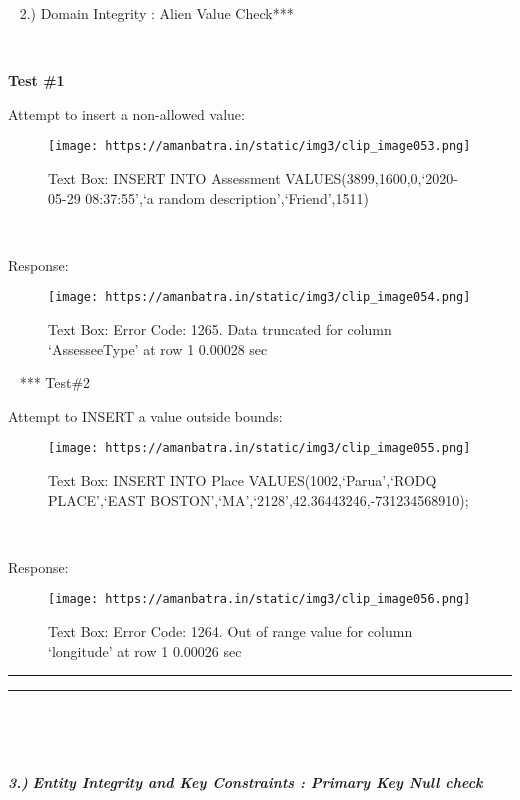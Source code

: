 \documentclass[
]{article}
\begin{document}
~ \textbf{\emph{ }}2.) Domain Integrity : Alien Value Check***

~

\textbf{Test \#1}

Attempt to insert a non-allowed value:

\begin{figure}
\centering
\texttt{[image: https://amanbatra.in/static/img3/clip\_image053.png]}
\caption{Text Box: INSERT INTO Assessment VALUES(3899,1600,0,`2020-05-29
08:37:55',`a random description',`Friend',1511)}
\end{figure}

~

Response:

\begin{figure}
\centering
\texttt{[image: https://amanbatra.in/static/img3/clip\_image054.png]}
\caption{Text Box: Error Code: 1265. Data truncated for column
`AssesseeType' at row 1 0.00028 sec}
\end{figure}

~ *** Test\#2

Attempt to INSERT a value outside bounds:

\begin{figure}
\centering
\texttt{[image: https://amanbatra.in/static/img3/clip\_image055.png]}
\caption{Text Box: INSERT INTO Place VALUES(1002,`Parua',`RODQ
PLACE',`EAST BOSTON',`MA',`2128',42.36443246,-731234568910);}
\end{figure}

~

Response:

\begin{figure}
\centering
\texttt{[image: https://amanbatra.in/static/img3/clip\_image056.png]}
\caption{Text Box: Error Code: 1264. Out of range value for column
`longitude' at row 1 0.00026 sec}
\end{figure}

\begin{center}\rule{0.5\linewidth}{0.5pt}\end{center}

\begin{center}\rule{0.5\linewidth}{0.5pt}\end{center}

~

~

\textbf{\emph{3.)}} \textbf{\emph{Entity Integrity and Key Constraints :
Primary Key Null check}}
\end{document}

